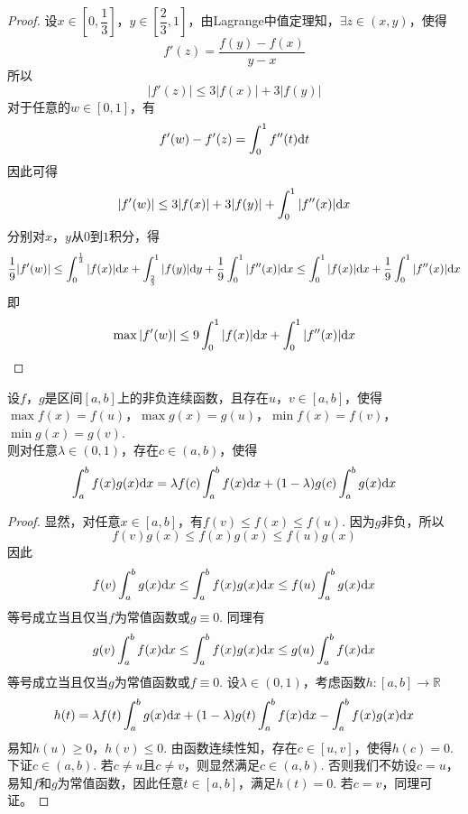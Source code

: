 \begin{proof}

    设$x \in \left[0, \dfrac{1}{3}\right]$，$y \in \left[\dfrac{2}{3}, 1\right]$，由\textup{Lagrange}中值定理知，$\exists z \in (x,y)$，使得
    $$f'(z) = \dfrac{f(y) - f(x)}{y - x}$$
    所以
    $$|f'(z)| \leq 3|f(x)| + 3|f(y)|$$
    对于任意的$w \in [0,1]$，有
    $$f'(w) - f'(z) = \int_{0}^{1}{f''(t)}\mathrm{d} t$$
    因此可得
    $$|f'(w)| \leq 3|f(x)| + 3|f(y)| + \int_{0}^{1}{|f''(x)|}\mathrm{d} x$$
    分别对$x$，$y$从$0$到$1$积分，得
    $$\dfrac{1}{9} |f'(w)| \leq \int_{0}^{\frac{1}{3}}{|f(x)|}\mathrm{d} x + \int_{\frac{2}{3}}^{1}{|f(y)|}\mathrm{d} y + \dfrac{1}{9} \int_{0}^{1}{|f''(x)|}\mathrm{d} x \leq \int_{0}^{1}{|f(x)|}\mathrm{d} x + \dfrac{1}{9}\int_{0}^{1}{|f''(x)|}\mathrm{d} x$$
    即
    $$\max{|f'(w)|} \leq 9\int_{0}^{1}{|f(x)|}\mathrm{d} x + \int_{0}^{1}{|f''(x)|}\mathrm{d} x$$
    
\end{proof}

\begin{theorem}
    
    设$f$，$g$是区间$[a,b]$上的非负连续函数，且存在$u$，$v \in [a,b]$，使得$\max{f(x)} = f(u)$，$\max{g(x)} = g(u)$，$\min{f(x)} = f(v)$，$\min{g(x)} = g(v)$. \\
    则对任意$\lambda \in (0,1)$，存在$c \in (a,b)$，使得
    $$\int_{a}^{b}{f(x)g(x)}\mathrm{d} x = \lambda f(c) \int_{a}^{b}{f(x)}\mathrm{d} x + (1 - \lambda)g(c)\int_{a}^{b}{g(x)}\mathrm{d} x$$

\end{theorem}

\begin{proof}

    显然，对任意$x \in [a,b]$，有$f(v) \leq f(x) \leq f(u)$. 因为$g$非负，所以
    $$f(v)g(x) \leq f(x)g(x) \leq f(u)g(x)$$
    因此
    $$f(v) \int_{a}^{b}{g(x)}\mathrm{d} x \leq \int_{a}^{b}{f(x)g(x)}\mathrm{d} x \leq f(u) \int_{a}^{b}{g(x)}\mathrm{d} x$$
    等号成立当且仅当$f$为常值函数或$g \equiv 0$. 同理有
    $$g(v) \int_{a}^{b}{f(x)}\mathrm{d} x \leq \int_{a}^{b}{f(x)g(x)}\mathrm{d} x \leq g(u) \int_{a}^{b}{f(x)}\mathrm{d} x$$
    等号成立当且仅当$g$为常值函数或$f \equiv 0$. 设$\lambda \in (0,1)$，考虑函数$h : [a,b] \to \mathbb{R}$
    $$h(t) = \lambda f(t) \int_{a}^{b}{g(x)}\mathrm{d} x + (1 - \lambda)g(t)\int_{a}^{b}{f(x)}\mathrm{d} x - \int_{a}^{b}{f(x)g(x)}\mathrm{d} x$$
    易知$h(u) \geq 0$，$h(v) \leq 0$. 由函数连续性知，存在$c \in [u,v]$，使得$h(c) = 0$. \\
    下证$c \in (a,b)$. 若$c \neq u$且$c \neq v$，则显然满足$c \in (a,b)$. 
    否则我们不妨设$c = u$，易知$f$和$g$为常值函数，因此任意$t \in [a,b]$，满足$h(t) = 0$. 若$c = v$，同理可证。

\end{proof} 

